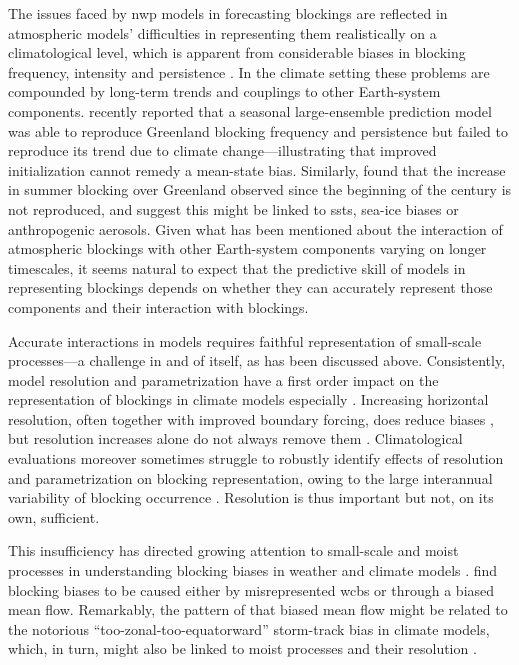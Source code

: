 The issues faced by \gls{nwp} models in forecasting blockings are reflected in
atmospheric models' difficulties in representing them realistically on
a climatological level, which is apparent from considerable biases in blocking
frequency, intensity and persistence
\parencite{daviniNorthernHemisphereAtmospheric2016}.
In the climate setting these problems are compounded by long-term trends and
couplings to other Earth-system components.
\textcite{leeIncreasingFrequencyPersistence2026} recently reported that a
seasonal large-ensemble prediction model was able to reproduce Greenland
blocking frequency and persistence but failed to reproduce its trend due to
climate change---illustrating that improved initialization cannot remedy a
mean-state bias. Similarly, \textcite{maddisonMissingIncreaseSummer2024}
found that the increase in summer blocking over Greenland observed since the
beginning of the century is not reproduced, and suggest this might be linked to
\glspl{sst}, sea-ice biases or anthropogenic aerosols. Given what has been
mentioned about the interaction of atmospheric blockings with other
Earth-system components varying on longer timescales, it seems natural to
expect that the predictive skill of models in representing blockings depends on
whether they can accurately represent those components and their interaction
with blockings.

Accurate interactions in models requires faithful representation of small-scale
processes---a challenge in and of itself, as has been discussed above.
Consistently, model resolution and parametrization have a first order impact
on the representation of blockings in climate models especially
\parencite{daviniImprovedWinterEuropean2017,
    schiemannResolutionSensitivityNorthern2017,
    woollingsBlockingItsResponse2018,
    strommenSensitivityEuroatlanticRegimes2019,
    schiemannNorthernHemisphereBlocking2020}. Increasing horizontal resolution,
often together with improved boundary forcing, does reduce biases
\parencite{gaoEnhancedSimulationAtmospheric2025}, but resolution increases
alone do not always remove them \parencite{fabianoEuroatlanticWeatherRegimes2020}.
Climatological evaluations moreover sometimes struggle to robustly identify
effects of resolution and parametrization on blocking representation, owing to
the large interannual variability of blocking
occurrence \parencite{hartungResolutionPhysicsAtmosphere2017}. Resolution is
thus important but not, on its own, sufficient.

This insufficiency has directed growing attention to small-scale and moist
processes in understanding blocking biases in weather and climate models
\parencite{wandelWhyMoistDynamic2024, steinfeldResponseMoistDry2022,
    nabizadeh3DStructureNorthern2021}.
\textcite{dolores-tesillosRoleMoistDry2025}
find blocking biases to be caused either by misrepresented \glspl{wcb} or
through a biased mean flow. Remarkably, the pattern of that biased mean flow
might be related to the notorious \enquote{too-zonal-too-equatorward}
storm-track bias in climate models, which, in turn, might also be linked to
moist processes and their resolution
\parencite{auestadLatentHeatingFeedback2025, schemmEliminatingDecadesOld2023}.

